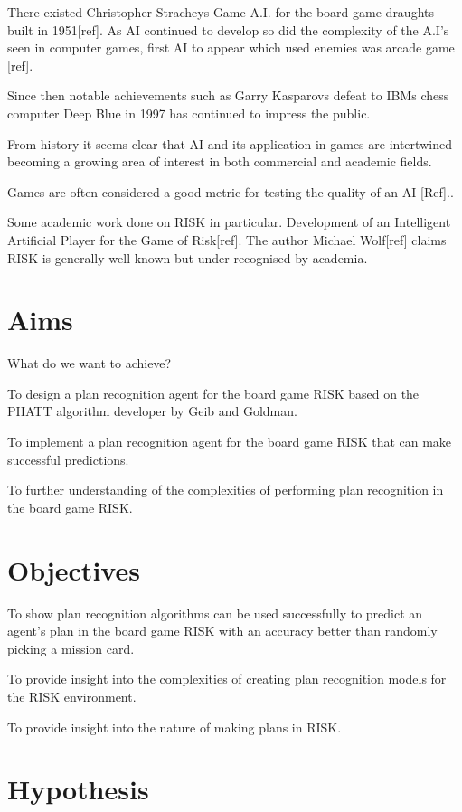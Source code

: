 \documentclass[parskip]{cs4rep}
\begin{document}
There existed Christopher Stracheys Game A.I. for the board game draughts built in 1951[ref]. As AI continued to develop so did the complexity of the A.I's seen in computer games, first AI to appear which used enemies was arcade game [ref].

Since then notable achievements such as Garry Kasparovs defeat to IBMs chess computer Deep Blue in 1997 has continued to impress the public. 

From history it seems clear that AI and its application in games are intertwined becoming a growing area of interest in both commercial and academic fields.

Games are often considered a good metric for testing the quality of an AI [Ref].. 

Some academic work done on RISK in particular. Development of an Intelligent Artificial Player for the Game of Risk[ref]. The author Michael Wolf[ref] claims RISK is generally well known but under recognised by academia.

\section{Aims}

What do we want to achieve?

To design a plan recognition agent for the board game RISK based on the PHATT algorithm developer by Geib and Goldman.

To implement a plan recognition agent for the board game RISK that can make successful predictions.

To further understanding of the complexities of performing plan recognition in the board game RISK.

\section{Objectives}

To show plan recognition algorithms can be used successfully to predict an agent's plan in the board game RISK with an accuracy better than randomly picking a mission card.

To provide insight into the complexities of creating plan recognition models for the RISK environment.

To provide insight into the nature of making plans in RISK. 

\section{Hypothesis}
\end{document}
